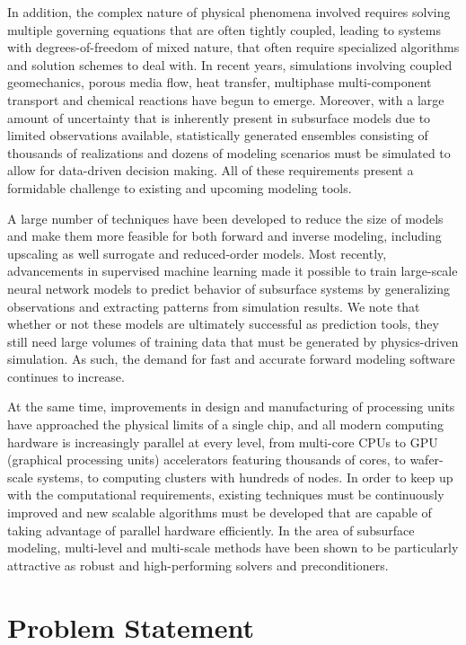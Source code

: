 In addition, the complex nature of physical phenomena involved requires solving multiple governing equations that are often tightly coupled, leading to systems with degrees-of-freedom of mixed nature, that often require specialized algorithms and solution schemes to deal with.   In recent years, simulations involving coupled geomechanics, porous media flow, heat transfer, multiphase multi-component transport and chemical reactions have begun to emerge.   Moreover, with a large amount of uncertainty that is inherently present in subsurface models due to limited observations available, statistically generated ensembles consisting of thousands of realizations and dozens of modeling scenarios must be simulated to allow for data-driven decision making.   All of these requirements present a formidable challenge to existing and upcoming modeling tools. 

A large number of techniques have been developed to reduce the size of models and make them more feasible for both forward and inverse modeling, including upscaling as well surrogate and reduced-order models.   Most recently, advancements in supervised machine learning made it possible to train large-scale neural network models to predict behavior of subsurface systems by generalizing observations and extracting patterns from simulation results.   We note that whether or not these models are ultimately successful as prediction tools, they still need large volumes of training data that must be generated by physics-driven simulation.   As such, the demand for fast and accurate forward modeling software continues to increase.

At the same time, improvements in design and manufacturing of processing units have approached the physical limits of a single chip, and all modern computing hardware is increasingly parallel at every level, from multi-core CPUs to GPU (graphical processing units) accelerators featuring thousands of cores, to wafer-scale systems, to computing clusters with hundreds of nodes.   In order to keep up with the computational requirements, existing techniques must be continuously improved and new scalable algorithms must be developed that are capable of taking advantage of parallel hardware efficiently.   In the area of subsurface modeling, multi-level and multi-scale methods have been shown to be particularly attractive as robust and high-performing solvers and preconditioners.

\section{Problem Statement}

